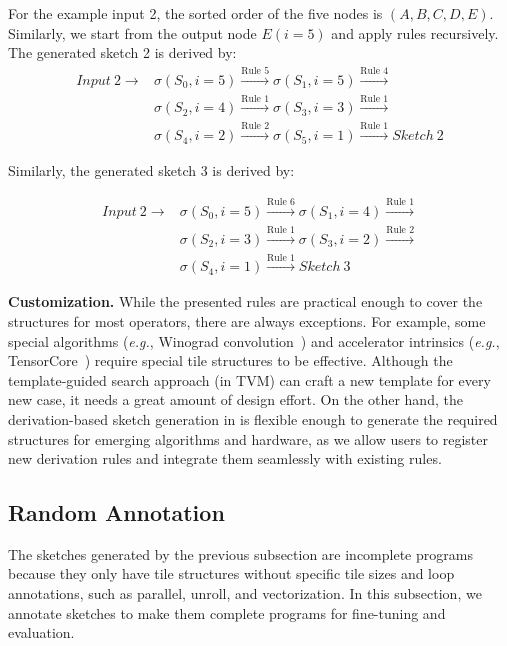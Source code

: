 For the example input 2, the sorted order of the five nodes is $(A, B, C, D, E)$.
Similarly, we start from the output node $E (i=5)$ and apply rules recursively.
The generated sketch 2 is derived by:
\preeq \preeq \preeq
\begin{align*}
 Input~2 \rightarrow  & \sigma(S_0, i = 5)  \xrightarrow{\text{Rule 5}}  \sigma(S_1, i = 5)  \xrightarrow{\text{Rule 4}} \\
 & \sigma(S_2, i = 4)  \xrightarrow{\text{Rule 1}} \sigma(S_3, i = 3) \xrightarrow{\text{Rule 1}} \\
 & \sigma(S_4, i = 2)  \xrightarrow{\text{Rule 2}} \sigma(S_5, i = 1)  \xrightarrow{\text{Rule 1}}  Sketch~2
\end{align*}
\posteq

\noindent Similarly, the generated sketch 3 is derived by:

\preeq \preeq
\begin{align*}
Input~2 \rightarrow  & \sigma(S_0, i = 5)  \xrightarrow{\text{Rule 6}}  \sigma(S_1, i = 4)  \xrightarrow{\text{Rule 1}} \\
& \sigma(S_2, i = 3)  \xrightarrow{\text{Rule 1}} \sigma(S_3, i = 2) \xrightarrow{\text{Rule 2}} \\
& \sigma(S_4, i = 1)  \xrightarrow{\text{Rule 1}}  Sketch~3
\end{align*}
\posteq


\textbf{Customization.}
While the presented rules are practical enough to cover the structures for most operators, there are always exceptions.
For example, some special algorithms (\textit{e.g.}, Winograd convolution~\cite{lavin2016fast}) and accelerator intrinsics (\textit{e.g.}, TensorCore~\cite{nvidia2017tensorcore}) require special tile structures to be effective.
Although the template-guided search approach (in TVM) can craft a new template for every new case, it needs a great amount of design effort.
On the other hand, the derivation-based sketch generation in \Ansor is flexible enough to generate the required structures for emerging algorithms and hardware, as we allow users to register new derivation rules and integrate them seamlessly with existing rules.

\subsection{Random Annotation}
\label{subsec:random-sampling}

The sketches generated by the previous subsection are incomplete programs because they only have tile structures without specific tile sizes and loop annotations, such as parallel, unroll, and vectorization.
In this subsection, we annotate sketches to make them complete programs for fine-tuning and evaluation.

